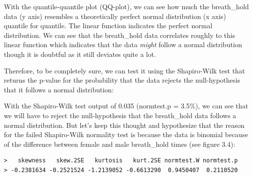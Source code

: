 \documentclass[]{article}
\newenvironment{Shaded}{\begin{snugshade}}{\end{snugshade}}
\newcommand{\DataTypeTok}[1]{\textcolor[rgb]{0.13,0.29,0.53}{#1}}
\newcommand{\KeywordTok}[1]{\textcolor[rgb]{0.13,0.29,0.53}{\textbf{#1}}}
\newcommand{\NormalTok}[1]{#1}
\newcommand{\OperatorTok}[1]{\textcolor[rgb]{0.81,0.36,0.00}{\textbf{#1}}}
\newcommand{\StringTok}[1]{\textcolor[rgb]{0.31,0.60,0.02}{#1}}
\begin{document}
With the quantile-quantile plot (QQ-plot), we can see how much the breath\_hold data (y axis) resembles a theoretically perfect normal distribution (x axis) quantile for quantile. The linear function indicates the perfect normal distribution. We can see that the breath\_hold data correlates roughly to this linear function which indicates that the data \emph{might} follow a normal distribution though it is doubtful as it still deviates quite a lot.

Therefore, to be completely sure, we can test it using the Shapiro-Wilk test that returns the p-value for the probability that the data rejects the null-hypothesis that it follows a normal distribution:

With the Shapiro-Wilk test output of 0.035 (normtest.p = 3.5\%), we can see that we will have to reject the null-hypothesis that the breath\_hold data follows a normal distribution. But let's keep this thought and hypothesize that the reason for the failed Shapiro-Wilk normality test is because the data is binomial because of the difference between female and male breath\_hold times (see figure 3.4):

\begin{Shaded}
\end{Shaded}

\begin{verbatim}
>   skewness   skew.2SE   kurtosis   kurt.2SE normtest.W normtest.p 
> -0.2381634 -0.2521524 -1.2139052 -0.6613290  0.9450407  0.2110520
\end{verbatim}

\begin{Shaded}
\end{Shaded}
\end{document}
